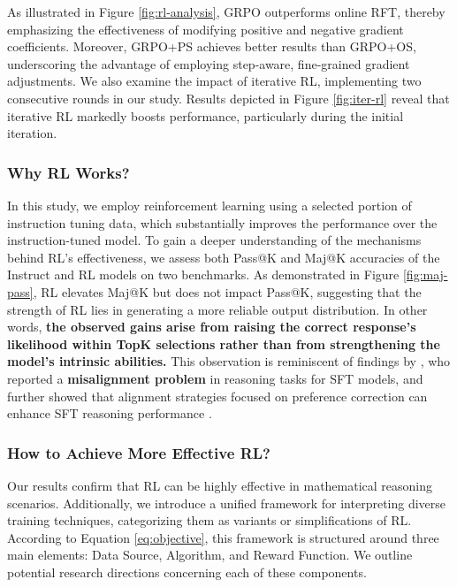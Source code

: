 {As illustrated in Figure \ref{fig:rl-analysis}, GRPO outperforms online RFT, thereby emphasizing the effectiveness of modifying positive and negative gradient coefficients. Moreover, GRPO+PS achieves better results than GRPO+OS, underscoring the advantage of employing step-aware, fine-grained gradient adjustments. We also examine the impact of iterative RL, implementing two consecutive rounds in our study. Results depicted in Figure \ref{fig:iter-rl} reveal that iterative RL markedly boosts performance, particularly during the initial iteration.

\subsubsection{Why RL Works?} In this study, we employ reinforcement learning using a selected portion of instruction tuning data, which substantially improves the performance over the instruction-tuned model. To gain a deeper understanding of the mechanisms behind RL's effectiveness, we assess both Pass@K and Maj@K accuracies of the Instruct and RL models on two benchmarks. As demonstrated in Figure \ref{fig:maj-pass}, RL elevates Maj@K but does not impact Pass@K, suggesting that the strength of RL lies in generating a more reliable output distribution. In other words, \textbf{the observed gains arise from raising the correct response’s likelihood within TopK selections rather than from strengthening the model’s intrinsic abilities.} This observation is reminiscent of findings by \citep{wang2023making}, who reported a \textbf{misalignment problem} in reasoning tasks for SFT models, and further showed that alignment strategies focused on preference correction can enhance SFT reasoning performance \citep{yuan2023rrhf,song2023preference,wang2023making}.

\subsubsection{How to Achieve More Effective RL?}
\label{sec:effec_rl}
Our results confirm that RL can be highly effective in mathematical reasoning scenarios. Additionally, we introduce a unified framework for interpreting diverse training techniques, categorizing them as variants or simplifications of RL. According to Equation \ref{eq:objective}, this framework is structured around three main elements: Data Source, Algorithm, and Reward Function. We outline potential research directions concerning each of these components.

}
